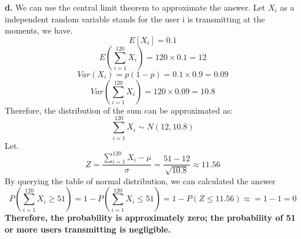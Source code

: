 \documentclass{cshwk}
\begin{document}
\noindent\textbf{d.} We can use the central limit theorem to approximate the answer. Let $X_i$ as a independent random variable stands for the user i is transmitting at the moments, we have.
$$
E[X_i] = 0.1
$$
$$
E(\sum_{i=1}^{120}X_i) = 120 \times 0.1 = 12
$$
$$
Var(X_i) = p(1-p) = 0.1 \times 0.9 = 0.09
$$
$$
Var(\sum_{i=1}^{120}X_i) = 120 \times 0.09 = 10.8
$$
Therefore, the distribution of the sum can be approximated as:
$$
\sum_{i=1}^{120}X_i \sim N(12, 10.8)
$$
Let.
$$
Z = \frac{\sum_{i=1}^{120}X_i - \mu}{\sigma} = \frac{51 - 12}{\sqrt{10.8}} \approx 11.56
$$
By querying the table of normal distribution, we can calculated the answer
$$
P(\sum_{i=1}^{120}X_i\geq 51) = 1- P(\sum_{i=1}^{120}X_i\leq 51) = 1 - P(Z\leq 11.56) \approx = 1 - 1 = 0
$$
\textbf{Therefore, the probability is approximately zero; the probability of 51 or more users transmitting is negligible.}
\end{document}
